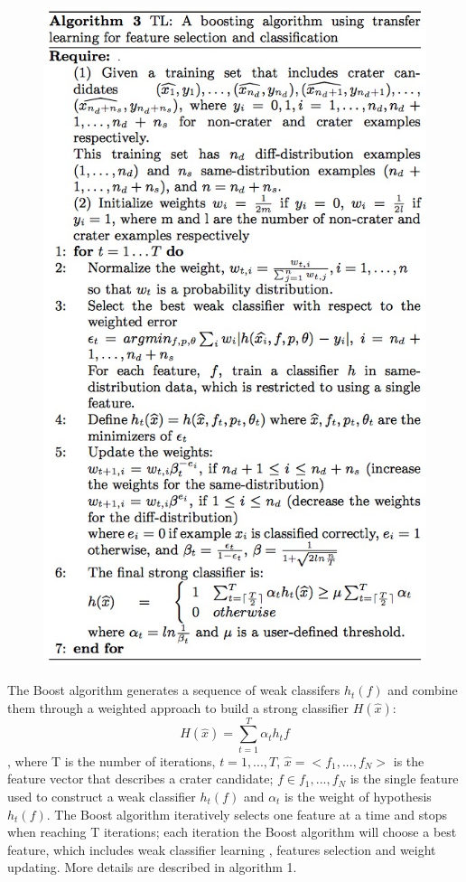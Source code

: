 \documentclass[conference]{IEEEtran}
\begin{document}
\begin{figure}[!hb]
\begin{center}
\includegraphics[scale=0.45]{TL.png}
\label{default}
\end{center}
\end{figure}

The Boost algorithm generates a sequence of weak classifers $h_t(f)$ and combine them through a weighted approach to build a strong classifier $H(\hat{x})$:
\begin{equation}
 H(\hat{x}) = \sum_{t=1}^{T}\alpha_th_t{f}
\end{equation},
where T is the number of iterations, $t = 1,...,T$, $\hat{x} = <f_1,...,f_N>$ is the feature vector that describes a crater candidate; $f \in {f_1,...,f_N}$ is the single feature used to construct a weak classifier $h_t(f)$ and $\alpha_t$ is the weight of hypothesis $h_t(f)$. The Boost algorithm iteratively selects one feature at a time and stops when reaching T iterations; each iteration the Boost algorithm will choose a best feature, which includes weak classifier learning , features selection and weight updating. More details are described in algorithm 1\cite{ding2011subkilometer}.
\end{document}
